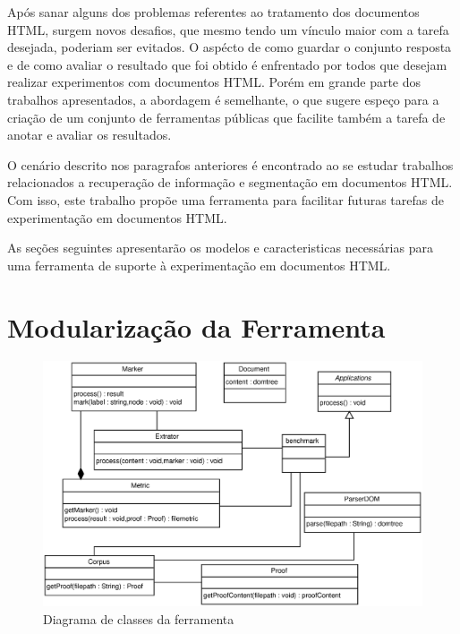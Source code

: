 \documentclass[12pt, a4paper]{article}
\begin{document}
Após sanar alguns dos problemas referentes ao tratamento dos documentos
HTML, surgem novos desafios, que mesmo tendo um vínculo maior com a tarefa
desejada, poderiam ser evitados. O aspécto de como guardar o conjunto
resposta e de como avaliar o resultado que foi obtido é enfrentado por
todos que desejam realizar experimentos com documentos HTML. Porém em
grande parte dos trabalhos apresentados, a abordagem é semelhante, o que
sugere espeço para a criação de um conjunto de ferramentas públicas que
facilite também a tarefa de anotar e avaliar os resultados.

O cenário descrito nos paragrafos anteriores é encontrado ao se estudar 
trabalhos relacionados a recuperação de informação e segmentação em documentos
HTML. Com isso, este trabalho propõe uma ferramenta para
facilitar futuras tarefas de experimentação em documentos HTML.

As seções seguintes apresentarão os modelos e caracteristicas
necessárias para uma ferramenta de suporte à experimentação em
documentos HTML.

\section{Modularização da Ferramenta}

\begin{figure}[htb]
  \begin{center}
  \includegraphics[width=13cm]{img/classes.eps}
  \caption{Diagrama de classes da ferramenta}
  \label{classes}
  \end{center}
\end{figure}

\end{document}
